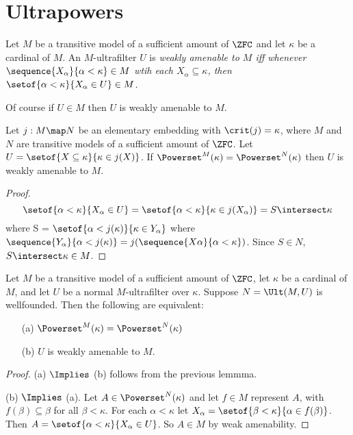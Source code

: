 \documentclass[oneside,12pt]{amsart}
\begin{document}
\section{Ultrapowers}

\begin{definition}
Let $M$ be a transitive model of a sufficient amount of $\ZFC$ and let $\kappa$ be
a cardinal of $M$. An $M$-ultrafilter $U$ is \em{weakly amenable} to $M$ iff whenever
$\sequence{X_{\alpha}}{\alpha<\kappa} \in M$ wtih each $X_{\alpha} \subseteq \kappa$,
then $\setof{\alpha < \kappa}{X_{\alpha} \in U} \in M$.
\end{definition}

Of course if $U\in M$ then $U$ is weakly amenable to $M$.

\begin{lemma}
Let $j:M \map N$ be an elementary embedding with $\crit(j)=\kappa$, where $M$ and $N$ are transitive models of a sufficient amount of $\ZFC$.
Let $U = \setof{X \subseteq \kappa}{\kappa \in j(X)}$. If
$\Powerset^{M}(\kappa) = \Powerset^{N}(\kappa)$ then $U$ is weakly amenable to $M$.
\end{lemma}
\begin{proof}
$$\setof{\alpha < \kappa}{X_{\alpha} \in U} =
\setof{\alpha < \kappa}{\kappa\in j(X_{\alpha})} =
S \intersect \kappa $$
where S = $\setof{\alpha < j(\kappa)}{\kappa\in Y_{\alpha}}$
where $\sequence{Y_{\alpha}}{\alpha<j(\kappa)} = j(\sequence{X{\alpha}}{\alpha<\kappa})$.
Since $S\in N$, $S \intersect \kappa \in M$.
\end{proof}

\begin{lemma}
\label{SameNextLevel}
Let $M$ be a transitive model of a sufficient amount of $\ZFC$, let $\kappa$ be
a cardinal of $M$, and let $U$ be a normal
 $M$-ultrafilter over $\kappa$. Suppose
$N = \Ult(M, U)$ is wellfounded. Then the following are equivalent:
\begin{itemize}
\item[(a)] $\Powerset^{M}(\kappa) = \Powerset^{N}(\kappa)$

\item[(b)] $U$ is weakly amenable to $M$.
\end{itemize}
\end{lemma}
\begin{proof}
(a) $\Implies$ (b) follows from the previous lemmma.

(b) $\Implies$ (a). Let $A\in\Powerset^{N}(\kappa)$  and let $f\in M$ represent
$A$, with $f(\beta) \subseteq \beta$ for all $\beta < \kappa$. For each $\alpha<\kappa$
let $X_{\alpha} = \setof{\beta < \kappa}{\alpha \in f(\beta)}$. Then
$A = \setof{\alpha<\kappa}{X_{\alpha} \in U}$. So $A\in M$ by weak amenability.
\end{proof}
\end{document}
